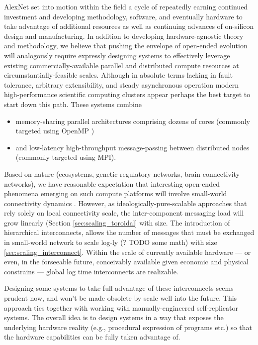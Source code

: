 AlexNet set into motion within the field a cycle of repeatedly earning continued investment and developing methodology, software, and eventually hardware to take advantage of additional resources as well as continuing advances of on-silicon design and manufacturing.
In addition to developing hardware-agnostic theory and methodology, we believe that pushing the envelope of open-ended evolution will analogously require expressly designing systems to effectively leverage existing commercially-available parallel and distributed compute resources at circumstantially-feasible scales.
Although in absolute terms lacking in fault tolerance, arbitrary extensibility, and steady asynchronous operation modern high-performance scientific computing clusters appear perhaps the best target to start down this path.
These systems combine
\begin{itemize}
\item memory-sharing parallel architectures comprising dozens of cores (commonly targeted using OpenMP \citep{dagum1998openmp})
\item and low-latency high-throughput message-passing between distributed nodes (commonly targeted using MPI\citep{clarke1994mpi}).
\end{itemize}


Based on nature (ecosystems, genetic regulatory networks, brain connectivity networks), we have reasonable expectation that interesting open-ended phenomena emerging on such compute platforms will involve small-world \citep{watts1998collective} connectivity dynamics \citep{bassett2017small} \citep{fox2014herbivores} \citep{gaiteri2014beyond}.
However, as ideologically-pure-scalable approaches that rely solely on local connectivity scale, the inter-component messaging load will grow linearly (Section \ref{sec:scaling_toroidal} with size.
The introduction of hierarchical interconnects, allows the number of messages that must be exchanged in small-world network to scale log-ly (? TODO some math) with size \ref{sec:scaling_interconnect}.
Within the scale of currently available hardware --- or even, in the forseeable future, conceivably available given economic and physical constrains --- global log time interconnects are realizable.

Designing some systems to take full advantage of these interconnects seems prudent now, and won't be made obsolete by scale well into the future.
This approach ties together with working with manually-engineered self-replicator systems.
The overall idea is to design systems in a way that exposes the underlying hardware reality (e.g., procedural expression of programs etc.) so that the hardware capabilities can be fully taken advantage of.

